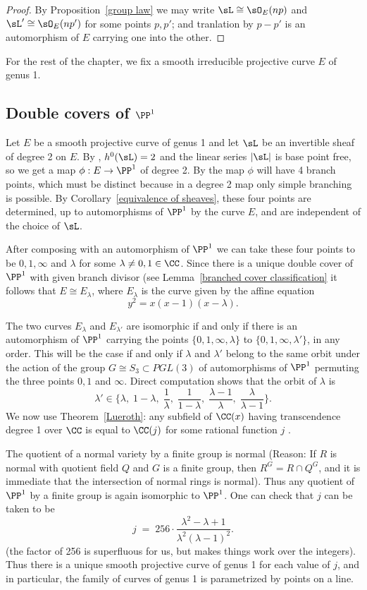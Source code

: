 \begin{proof}
By Proposition~\ref{group law} we may write $\sL \cong \sO_E(np)$ and $\sL'\cong \sO_E(np')$ for some points $p,p'$; and tranlation by $p-p'$
is an automorphism of $E$ carrying one into the other.
\end{proof}


For the rest of the chapter, we fix a smooth irreducible projective curve $E$ of genus 1.

\subsection{Double covers of $\PP^1$}

Let $E$ be a smooth projective curve of genus 1 and let  $\sL$ be an invertible sheaf of degree 2 on $E$. By \trr{},\kern -3pt $h^0(\sL) = 2$ and the linear series $|\sL|$ is base point free, so we get a map $\phi : E \to \PP^1$ of degree 2. By \trh the map $\phi$ will have 4 branch points, which must be distinct because in a degree 2 map
only simple branching is possible. By Corollary~\ref{equivalence of sheaves}, these four points are determined, up to automorphisms of $\PP^1$ by the curve $E$, and are independent of the choice of $\sL$.

After composing with an automorphism of $\PP^1$ we can take these four points to be $0, 1, \infty$ and $\lambda$ for some $\lambda \neq 0, 1 \in \CC$. Since there is a unique double cover of $\PP^1$ with given branch divisor (see Lemma~\ref{branched cover classification} it follows that $E \cong E_\lambda$, where $E_\lambda$ is the curve given by the affine equation
$$
y^2 = x(x-1)(x-\lambda).
$$

The two curves $E_\lambda$ and $E_{\lambda'}$ are isomorphic if and only if there is an automorphism of $\PP^1$ carrying the points $\{0,1,\infty,\lambda\}$ to $\{0,1,\infty,\lambda'\}$, in any order. This will be the case if and only if $\lambda$ and $\lambda'$ belong to the same orbit under the action of the group $G \cong S_3 \subset PGL(3)$ of automorphisms of $\PP^1$ permuting the three points $0, 1$ and $\infty$. Direct computation shows that the orbit of $\lambda$ is
$$
\lambda' \in \{\lambda, \; 1-\lambda, \; \frac{1}{\lambda},\;  \frac{1}{1-\lambda}, \; \frac{\lambda - 1}{\lambda}, \; \frac{\lambda}{\lambda - 1} \}.
$$
We now use Theorem~\ref{Lueroth}: any subfield of $\CC(x)$ having transcendence degree 1 over $\CC$ is equal to $\CC(j)$ for some rational function $j$ .

The quotient of a normal variety by a finite group is normal (Reason: If $R$ is normal  with quotient field $Q$ and $G$ is a finite group,
then $R^G = R\cap Q^G$, and it is immediate that the intersection of normal rings is normal). Thus any quotient of $\PP^1$ by a finite group is again isomorphic to $\PP^1$.
One can check that $j$ can be taken to be
$$
j \; = \; 256\cdot \frac{\lambda^2 - \lambda + 1}{\lambda^2(\lambda - 1)^2}.
$$
(the factor of 256 is superfluous for us, but makes things work over the integers). Thus there is a unique smooth projective curve of genus 1 for each value of $j$, and in particular, the family of
curves of genus 1 is parametrized by points on a line.

